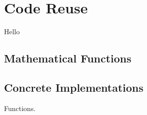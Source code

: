 \chapter{Code Reuse}

Hello

\section{Mathematical Functions}

\section{Concrete Implementations}

\csharpsubsection{\csharp}

\begin{syntaxfloat}
  
  \caption{Functions.}
  \label{syntax:fun}
\end{syntaxfloat}






